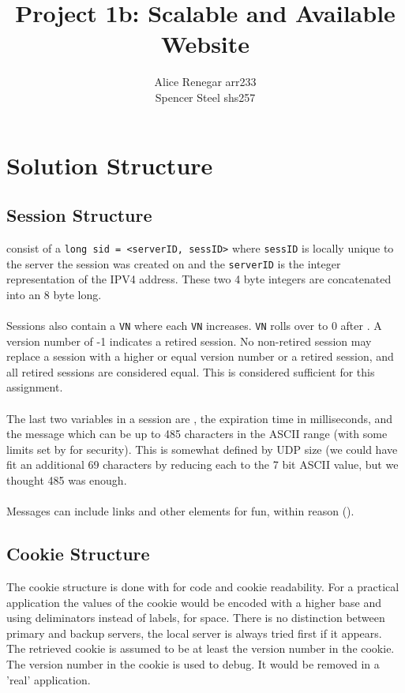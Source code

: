 \documentclass[11pt,letterpaper]{article}
\title{Project 1b: Scalable and Available Website}
\author{Alice Renegar arr233 \\ Spencer Steel shs257}
\begin{document}
\univlogo
{\let\newpage\relax\maketitle}

\section{Solution Structure}
\subsection{Session Structure}
 consist of a \texttt{long sid = <serverID, sessID>} where \texttt{sessID} is locally unique to the server the session was created on and the \texttt{serverID} is the integer representation of the IPV4 address. These two 4 byte integers are concatenated into an 8 byte long.
\\
\\
Sessions also contain a  \texttt{VN} where each \texttt{VN} increases. \texttt{VN} rolls over to 0 after . A version number of -1 indicates a retired session. No non-retired session may replace a session with a higher or equal version number or a retired session, and all retired sessions are considered equal. This is considered sufficient for this assignment.
\\
\\
The last two variables in a session are , the expiration time in milliseconds, and the message which can be up to 485 characters in the ASCII range (with some limits set by  for security). This is somewhat defined by UDP size (we could have fit an additional 69 characters by reducing each to the 7 bit ASCII value, but we thought 485 was enough.
\\
\\
Messages can include  links and other elements for fun, within reason ().
\subsection{Cookie Structure}
The cookie structure is done with  for code and cookie readability. For a practical application the values of the cookie would be encoded with a higher base and using deliminators instead of labels, for space. There is no distinction between primary and backup servers, the local server is always tried first if it appears. The retrieved cookie is assumed to be at least the version number in the cookie. The version number in the cookie is used to debug. It would be removed in a 'real' application.
\end{document}
